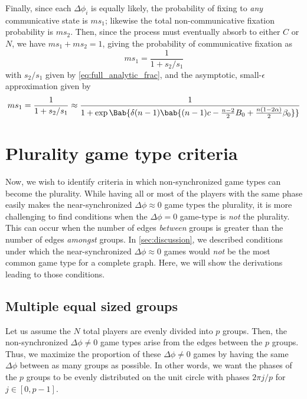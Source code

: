 Finally, since each $\Delta \phi_i$ is equally likely,
the probability of fixing to \emph{any}
communicative state is $m s_1$;
likewise the total non-communicative fixation probability is $m s_2$.
Then, since the process must eventually absorb to either $C$ or $N$,
we have
$m s_1 + m s_2 = 1$, giving the probability of communicative fixation as
\begin{equation}
  m s_1 = \frac{1}{1 + s_2/s_1}
  \label{eq:full_analytic}
\end{equation}
with $s_2/s_1$ given by \cref{eq:full_analytic_frac},
and the asymptotic, small-$\epsilon$ approximation given by
\begin{equation}
  m s_1 = \frac{1}{1 + s_2/s_1}
  \approx
  \frac{1}
  {1 + \exp \Bab{\delta (n-1) \bab{
    (n-1) c
    - \frac{n-2}{2} B_0
    +
    \frac{n (1 - 2 \alpha)}{2} \beta_0
    }}
  }
  \label{eq:analytic_first_term}
\end{equation}

\section{Plurality game type criteria}
Now, we wish to identify criteria in which
non-synchronized game types can become the plurality.
While having all or most of the players with the same phase
easily makes the near-synchronized $\Delta \phi \approx 0$
game types the plurality,
it is more challenging to find conditions
when the $\Delta \phi = 0$ game-type is \emph{not} the plurality.
This can occur when the number of edges \emph{between} groups
is greater than the number of edges \emph{amongst} groups.
In \cref{sec:discussion}, we described conditions under which
the near-synchronized $\Delta \phi \approx 0$ games would \emph{not} be
the most common game type for a complete graph.
Here, we will show the derivations leading to those conditions.

\subsection{Multiple equal sized groups}\label{sec:multiple_equal_groups}
Let us assume the $N$ total players are evenly divided
into $p$ groups.
Then, the non-synchronized $\Delta \phi \neq 0$ game types
arise from the edges between the $p$ groups.
Thus, we maximize the proportion of these $\Delta \phi \neq 0$ games
by having the same $\Delta \phi$ between as many groups as possible.
In other words, we want the phases of the $p$ groups
to be evenly distributed on the unit circle with phases $2 \pi j/p$
for $j \in [0,p-1]$.

